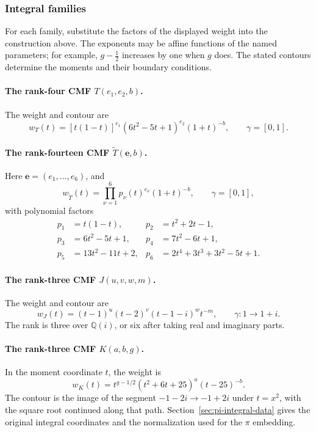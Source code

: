 \documentclass[oneside,english,11pt]{amsart}
\begin{document}
\subsubsection{Integral families}
For each family, substitute the factors of the displayed weight into the
construction above. The exponents may be affine functions of the named
parameters; for example, $g-\tfrac12$ increases by one when $g$ does.
The stated contours determine the moments and their boundary conditions.

\smallskip
\paragraph{\textbf{The rank-four CMF $T(e_1,e_2,b)$.}}
The weight and contour are
\[
 w_T(t)=[t(1-t)]^{e_1}(6t^2-5t+1)^{e_2}(1+t)^{-b},
 \qquad \gamma=[0,1].
\]

\smallskip
\paragraph{\textbf{The rank-fourteen CMF $\widetilde T(\mathbf e,b)$.}}
Here $\mathbf e=(e_1,\ldots,e_6)$, and
\[
 w_{\widetilde T}(t)=\prod_{\nu=1}^6p_\nu(t)^{e_\nu}(1+t)^{-b},
 \qquad \gamma=[0,1],
\]
with polynomial factors
\[
\begin{aligned}
 p_1&=t(1-t),&p_2&=t^2+2t-1,\\
 p_3&=6t^2-5t+1,&p_4&=7t^2-6t+1,\\
 p_5&=13t^2-11t+2,&p_6&=2t^4+3t^3+3t^2-5t+1.
\end{aligned}
\]

\smallskip
\paragraph{\textbf{The rank-three CMF $J(u,v,w,m)$.}}
The weight and contour are
\[
 w_J(t)=(t-1)^u(t-2)^v(t-1-i)^w t^{-m},
 \qquad \gamma:1\longrightarrow1+i.
\]
The rank is three over $\mathbb Q(i)$, or six after taking real and
imaginary parts.

\smallskip
\paragraph{\textbf{The rank-three CMF $K(a,b,g)$.}}
In the moment coordinate $t$, the weight is
\[
 w_K(t)=t^{g-1/2}(t^2+6t+25)^a(t-25)^{-b}.
\]
The contour is the image of the segment $-1-2i\to-1+2i$ under $t=x^2$,
with the square root continued along that path.
Section~\ref{sec:pi-integral-data} gives the original integral coordinates
and the normalization used for the $\pi$ embedding.
\end{document}
